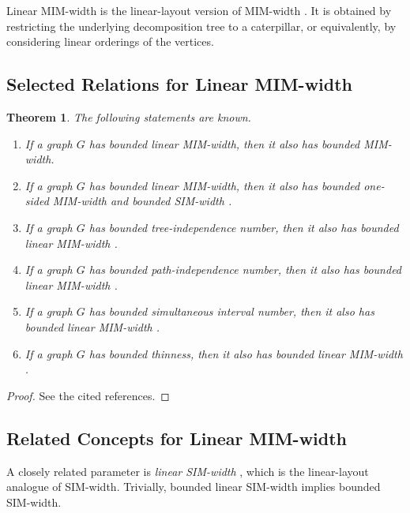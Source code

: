 \documentclass[10pt]{book}
\newtheorem{theorem}{Theorem}[section]
\theoremstyle{definition}
\begin{document}
Linear MIM-width is the linear-layout version of MIM-width \cite{31,32}.  
It is obtained by restricting the underlying decomposition tree to a caterpillar, or equivalently, by considering linear orderings of the vertices.

\subsection{Selected Relations for Linear MIM-width}

\begin{theorem}
The following statements are known.
\begin{enumerate}
    \item If a graph \(G\) has bounded linear MIM-width, then it also has bounded MIM-width.

    \item If a graph \(G\) has bounded linear MIM-width, then it also has bounded one-sided MIM-width and bounded SIM-width \cite{beisegel2024simultaneous}.

    \item If a graph \(G\) has bounded tree-independence number, then it also has bounded linear MIM-width \cite{beisegel2024simultaneous}.

    \item If a graph \(G\) has bounded path-independence number, then it also has bounded linear MIM-width \cite{beisegel2024simultaneous}.

    \item If a graph \(G\) has bounded simultaneous interval number, then it also has bounded linear MIM-width \cite{beisegel2024simultaneous}.

    \item If a graph \(G\) has bounded thinness, then it also has bounded linear MIM-width \cite{beisegel2024simultaneous}.
\end{enumerate}
\end{theorem}

\begin{proof}
See the cited references.
\end{proof}

\subsection{Related Concepts for Linear MIM-width}

A closely related parameter is \emph{linear SIM-width} \cite{34}, which is the linear-layout analogue of SIM-width.  
Trivially, bounded linear SIM-width implies bounded SIM-width.
\end{document}
